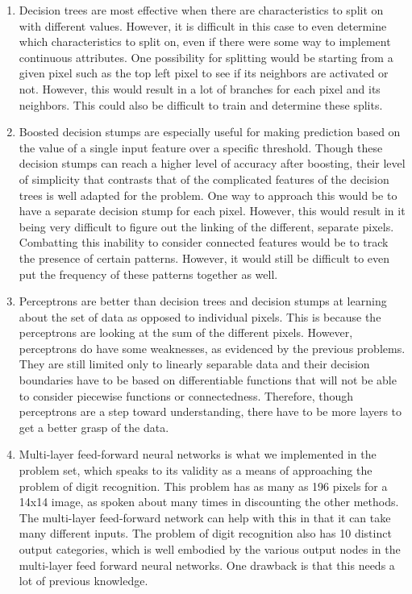 \documentclass[11pt]{article}
\begin{document}
\begin{enumerate}
\begin{enumerate}
	\item Decision trees are most effective when there are characteristics to split on with different values. However, it is difficult in this case to even determine which characteristics to split on, even if there were some way to implement continuous attributes. One possibility for splitting would be starting from a given pixel such as the top left pixel to see if its neighbors are activated or not. However, this would result in a lot of branches for each pixel and its neighbors. This could also be difficult to train and determine these splits.
	\item Boosted decision stumps are especially useful for making prediction based on the value of a single input feature over a specific threshold. Though these decision stumps can reach a higher level of accuracy after boosting, their level of simplicity that contrasts that of the complicated features of the decision trees is well adapted for the problem. One way to approach this would be to have a separate decision stump for each pixel. However, this would result in it being very difficult to figure out the linking of the different, separate pixels. Combatting this inability to consider connected features would be to track the presence of certain patterns. However, it would still be difficult to even put the frequency of these patterns together as well.
	\item Perceptrons are better than decision trees and decision stumps at learning about the set of data as opposed to individual pixels. This is because the perceptrons are looking at the sum of the different pixels. However, perceptrons do have some weaknesses, as evidenced by the previous problems. They are still limited only to linearly separable data and their decision boundaries have to be based on differentiable functions that will not be able to consider piecewise functions or connectedness. Therefore, though perceptrons are a step toward understanding, there have to be more layers to get a better grasp of the data. 
	\item Multi-layer feed-forward neural networks is what we implemented in the problem set, which speaks to its validity as a means of approaching the problem of digit recognition. This problem has as many as 196 pixels for a 14x14 image, as spoken about many times in discounting the other methods. The multi-layer feed-forward network can help with this in that it can take many different inputs. The problem of digit recognition also has 10 distinct output categories, which is well embodied by the various output nodes in the multi-layer feed forward neural networks. One drawback is that this needs a lot of previous knowledge. 

\end{enumerate}
\end{enumerate}
\end{document}
